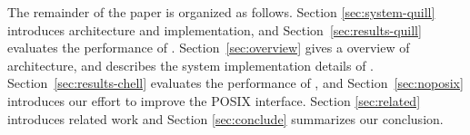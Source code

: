 The remainder of the paper is organized as follows. Section
\ref{sec:system-quill} introduces \DAChell{} architecture and implementation,
and Section~\ref{sec:results-quill} evaluates the performance of \DAChell{}.
Section~\ref{sec:overview} gives a overview of \CChell{} architecture, and
describes the system implementation details of \CChell{}.
Section~\ref{sec:results-chell} evaluates the
performance of \CChell{}, and Section~\ref{sec:noposix} introduces our effort
to improve the POSIX interface. Section \ref{sec:related} introduces
related work and Section \ref{sec:conclude} summarizes our conclusion.




